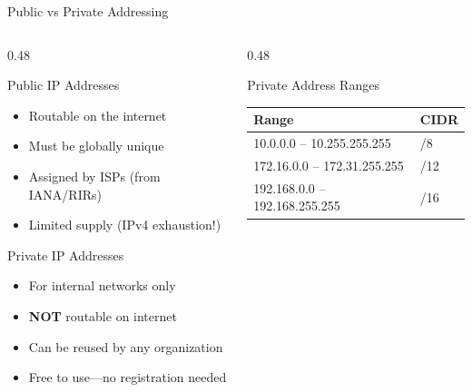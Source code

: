 \documentclass[aspectratio=169]{beamer}  %
\begin{document}
\begin{frame}{Public vs Private Addressing}
    \begin{columns}[T]
        \begin{column}{0.48\textwidth}
            \begin{block}{Public IP Addresses}
                \begin{itemize}
                    \item Routable on the internet
                    \item Must be globally unique
                    \item Assigned by ISPs (from IANA/RIRs)
                    \item Limited supply (IPv4 exhaustion!)
                \end{itemize}
            \end{block}
            
            \vspace{0.3em}
            \begin{block}{Private IP Addresses}
                \begin{itemize}
                    \item For internal networks only
                    \item \textbf{NOT} routable on internet
                    \item Can be reused by any organization
                    \item Free to use---no registration needed
                \end{itemize}
            \end{block}
        \end{column}
        \begin{column}{0.48\textwidth}
            \begin{alertblock}{Private Address Ranges}
                \begin{center}
                    \begin{tabular}{l l}
                        \textbf{Range} & \textbf{CIDR} \\
                        \midrule
                        10.0.0.0 -- 10.255.255.255 & /8 \\
                        172.16.0.0 -- 172.31.255.255 & /12 \\
                        192.168.0.0 -- 192.168.255.255 & /16 \\
                    \end{tabular}
                \end{center}
            \end{alertblock}
            

\end{column}
\end{columns}
\end{frame}
\end{document}
